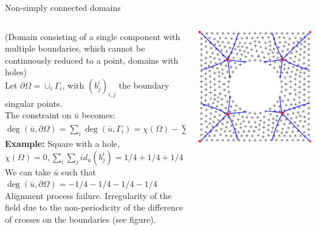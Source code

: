\documentclass[compress,10pt,aspectratio=169]{beamer}
\begin{document}
\begin{frame}{Non-simply connected domains}
\small
\vspace{-0.5cm}
\begin{columns}
\begin{column}{0.85\textwidth}
{\color{onera_gray}(Domain consisting of a single component with multiple boundaries, which cannot be continuously reduced to a point, domains with holes)}\\\vspace{0.08cm}
Let $\partial\Omega=\cup_i\Gamma_i$, with $(b_j^i)_{i,j}$ the boundary singular points.\\\vspace{0.12cm}
The constraint on $\bar{u}$ becomes:
    $\deg(\bar{u}, \partial\Omega)=\sum_i \deg(\bar{u},\Gamma_i)=\chi(\Omega)-\sum_i\sum_j id_{\bar{u}}(b_j^i).$\\\vspace{0.12cm}
\textbf{Example:} Square with a hole, $\chi(\Omega)=0, \sum_i\sum_j id_{\bar{u}}(b_j^i)=1/4+1/4+1/4+1/4$\\\vspace{0.12cm}
We can take $\bar{u}$ such that $\deg(\bar{u}, \partial\Omega)=-1/4-1/4-1/4-1/4$\\\vspace{0.12cm}
{\color{onera_gray} Alignment process failure. Irregularity of the field due to the non-periodicity of the difference of crosses on the boundaries (see figure).}\\\vspace{0.08cm}
\end{column}
\begin{column}{0.18\textwidth}
\centering
\includegraphics[scale=0.32]{images/carreDiscVide_stream_non_align_beam.pdf}

\end{column}
\end{columns}
\end{frame}
\end{document}
